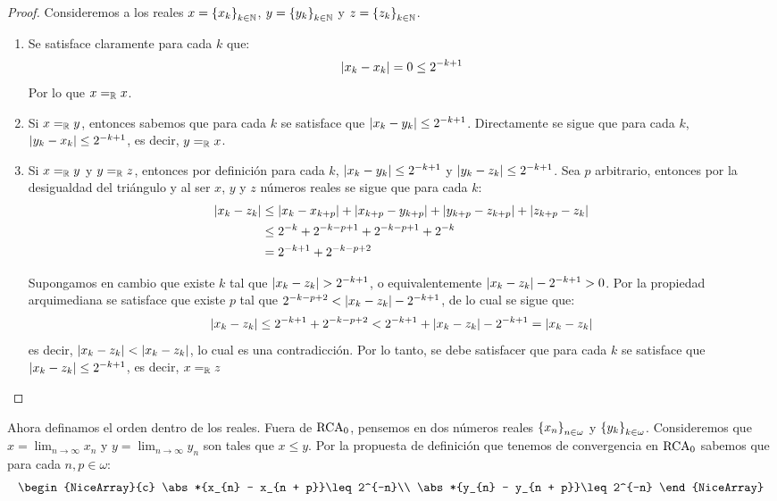 \begin{proof}
	Consideremos a los reales $x =\set*{x_{k}}_{k\in\NN}$, $y =\set*{y_{k}}_{k\in\NN}$ y $z =\set*{z_{k}}_{k\in\NN}$.

	\begin{enumerate}
		\item Se satisface claramente para cada $k$ que:
		\[
			\abs*{x_{k} - x_{k}} = 0\leq 2^{-k + 1}
		\]
		Por lo que $x =_{\RR} x$.

		\item Si $x =_{\RR} y$, entonces sabemos que para cada $k$ se satisface que $\abs*{x_{k} - y_{k}}\leq 2^{-k + 1}$. Directamente se sigue que para cada $k$, $\abs*{y_{k} - x_{k}}\leq 2^{-k + 1}$, es decir, $y =_{\RR} x$.
		
		\item Si $x =_{\RR} y$ y $y =_{\RR} z$, entonces por definición para cada $k$, $\abs*{x_{k} - y_{k}}\leq 2^{-k + 1}$ y $\abs*{y_{k} - z_{k}}\leq 2^{-k + 1}$. Sea $p$ arbitrario, entonces por la desigualdad del triángulo y al ser $x$, $y$ y $z$ números reales se sigue que para cada $k$:
		\begin{align*}
			\abs*{x_{k} - z_{k}} &\leq\abs*{x_{k} - x_{k + p}} +\abs*{x_{k + p} - y_{k + p}} +\abs*{y_{k + p} - z_{k + p}} +\abs*{z_{k + p} - z_{k}}\\
			&\leq 2^{-k} + 2^{- k - p + 1} + 2^{-k - p + 1} + 2^{-k}\\
			&= 2^{-k + 1} + 2^{-k - p + 2}
		\end{align*}

		Supongamos en cambio que existe $k$ tal que $\abs*{x_{k} - z_{k}} > 2^{-k + 1}$, o equivalentemente $\abs*{x_{k} - z_{k}} - 2^{-k + 1} > 0$. Por la propiedad arquimediana se satisface que existe $p$ tal que $2^{- k - p + 2} < \abs*{x_{k} - z_{k}} - 2^{-k + 1}$, de lo cual se sigue que:
		\[
			\abs*{x_{k} - z_{k}}\leq 2^{-k + 1} + 2^{-k - p + 2} < 2^{-k + 1} +\abs*{x_{k} - z_{k}} - 2^{-k + 1} = \abs*{x_{k} - z_{k}}
		\]
		es decir, $\abs*{x_{k} - z_{k}} <\abs*{x_{k} - z_{k}}$, lo cual es una contradicción. Por lo tanto, se debe satisfacer que para cada $k$ se satisface que $\abs*{x_{k} - z_{k}}\leq 2^{-k + 1}$, es decir, $x =_{\RR} z$
	\end{enumerate}
\end{proof}

Ahora definamos el orden dentro de los reales. Fuera de $\RCA$, pensemos en dos números reales $\set*{x_{n}}_{n\in\omega}$ y $\set*{y_{k}}_{k\in\omega}$. Consideremos que $x =\lim_{n\to\infty}x_{n}$ y $y =\lim_{n\to\infty}y_{n}$ son tales que $x\leq y$. Por la propuesta de definición que tenemos de convergencia en $\RCA$ sabemos que para cada $n, p\in\omega$:
\[
	\begin{NiceArray}{c}
		\abs*{x_{n} - x_{n + p}}\leq 2^{-n}\\
		\abs*{y_{n} - y_{n + p}}\leq 2^{-n}
	\end{NiceArray}
\]

